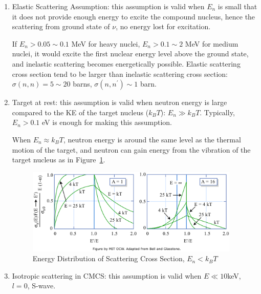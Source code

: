 \documentclass{school-22.101-notes}
\begin{document}
\begin{enumerate}
\item Elastic Scattering Assumption: this assumption is valid when $E_n$ is small that it does not provide enough energy to excite the compound nucleus, hence the scattering from ground state of $\nu$, no energy lost for excitation. 

If $E_n > 0.05 \sim 0.1$ MeV for heavy nuclei, $E_n > 0.1 \sim 2$ MeV for medium nuclei, it would excite the first nuclear energy level above the ground state, and inelastic scattering becomes energetically possible. Elastic scattering cross section tend to be larger than inelastic scattering cross section: $\sigma (n,n) = 5\sim20$ barns, $\sigma(n,n^{\prime}) \sim 1$ barn.

\item Target at rest: this assumption is valid when neutron energy is large compared to the KE of the target nucleus ($k_B T$): $E_n \gg k_B T$. Typically, $E_n > 0.1$ eV is enough for making this assumption. 

When $E_n \approx k_B T$, neutron energy is around the same level as the thermal motion of the target, and neutron can gain energy from the vibration of the target nucleus as in Figure~\ref{lower-neutron-energy}. 
\begin{figure}
    \centering
    \includegraphics[width=4in]{images/ni/lower-neutron-energy.png}
    \caption{Energy Distribution of Scattering Cross Section, $E_n < k_B T$\label{lower-neutron-energy}}
\end{figure}

\item Isotropic scattering in CMCS: this assumption is valid when $E \ll 10 $keV, $l=0$, S-wave. 


\end{enumerate}
\end{document}

